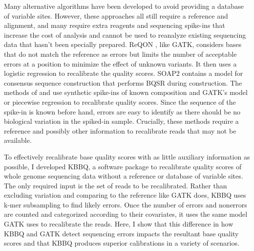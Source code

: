 Many alternative algorithms have been developed to avoid providing a database of variable sites. However, these approaches all still require a reference and alignment, and many require extra reagents and sequencing spike-ins that increase the cost of analysis and cannot be used to reanalyze existing sequencing data that hasn't been specially prepared.
ReQON \parencite{cabanski_reqon:_2012}, like GATK, considers bases that do not match the reference as errors but limits the number of acceptable errors at a position to minimize the effect of unknown variants. It then uses a logistic regression to recalibrate the quality scores.
SOAP2 \parencite{li_soap2:_2009} contains a model for consensus sequence construction that performs BQSR during construction. %
The methods of \textcite{zook_synthetic_2012} and \textcite{ni_improvement_2016} use synthetic spike-ins of known composition and GATK's model \parencite{zook_synthetic_2012} or piecewise regression \parencite{ni_improvement_2016} to recalibrate quality scores. Since the sequence of the spike-in is known before hand, errors are easy to identify as there should be no biological variation in the spiked-in sample.
Crucially, these methods require a reference and possibly other information to recalibrate reads that may not be available.

To effectively recalibrate base quality scores with as little auxiliary information as possible, I developed KBBQ, a software package to recalibrate quality scores of whole genome sequencing data without a reference or database of variable sites. The only required input is the set of reads to be recalibrated. Rather than excluding variation and comparing to the reference like GATK does, KBBQ uses k-mer subsampling to find likely errors. Once the number of errors and nonerrors are counted and categorized according to their covariates, it uses the same model GATK uses to recalibrate the reads. Here, I show that this difference in how KBBQ and GATK detect sequencing errors impacts the resultant base quality scores and that KBBQ produces superior calibrations in a variety of scenarios.

